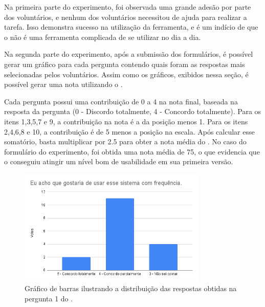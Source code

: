 \documentclass[12pt]{tcc}
\begin{document}
	Na primeira parte do experimento, foi observada uma grande adesão por parte dos voluntários, e nenhum dos voluntários necessitou de ajuda para realizar a tarefa. Isso demonstra sucesso na utilização da ferramenta, e é um indício de que o  não é uma ferramenta complicada de se utilizar no dia a dia.

	Na segunda parte do experimento, após a submissão dos formulários, é possível gerar um gráfico para cada pergunta contendo quais foram as respostas mais selecionadas pelos voluntários. Assim como os gráficos, exibidos nessa seção, é possível gerar uma nota utilizando o .

	Cada pergunta possui uma contribuição de 0 a 4 na nota final, baseada na resposta da pergunta (0 - Discordo totalmente, 4 - Concordo totalmente). Para os itens 1,3,5,7 e 9, a contribuição na nota é a da posição menos 1. Para os itens 2,4,6,8 e 10, a contribuição é de 5 menos a posição na escala. Após calcular esse somatório, basta multiplicar por 2.5 para obter a nota média do  \citep{brooke1995sus}. No caso do formulário do experimento, foi obtida uma nota média de 75, o que evidencia que o  conseguiu atingir um nível bom de usabilidade em sua primeira versão.




	\begin{figure}[!ht]
		\centering
		\includegraphics[width=0.8\textwidth]{figures/respostas-pergunta-1.png}
		\caption[Respostas obtidas na pergunta 1 do formulário de avaliação]{Gráfico de barras ilustrando a distribuição das respostas obtidas na pergunta 1 do .}
		\label{fig:respostas-pergunta-1}
	\end{figure}

	\pagebreak
\end{document}

